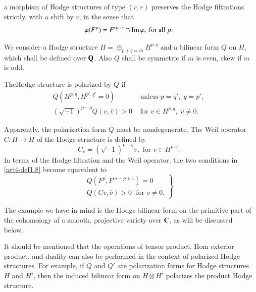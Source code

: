 a morphism of Hodge structures of type $(r,r)$ preserves the Hodge filtrations strictly, with a shift by $r$, in the sense that 
\begin{equation}
\varphi(F^p) = F'^{p+r} \cap \operatorname{Im} \varphi, \text{ for all } p. 
\label{art4-eq1.7}
\end{equation}

We consider a Hodge structure $H = \oplus_{p+q = m} H^{p,q}$ and a bilinear form $Q$ on $H$, which shall be defined over $\mathbf{Q}$. Also $Q$ shall be symmetric if $m$ is even, skew if $m$ is odd.

\begin{definition}\label{art4-def1.8}
The\pageoriginale Hodge structure is polarized by $Q$ if 
$$
\begin{matrix}
Q (H^{p,q} , H^{p', q'} =0) & \text{ unless } p = q', \; q = p',\\[2pt]
(\sqrt{-1})^{p-q} Q (v, \bar{v}) > 0 & \text{ for } v \in H^{p,q}, \; v \neq 0.
\end{matrix}
$$
\end{definition}

Apparently, the polarization form $Q$ must be nondegenerate. The Weil operator $C: H \to H$ of the Hodge structure is defined by 
\begin{equation}
C_v = (\sqrt{-1})^{p-q} v, \text{ for } v \in H^{p,q} . \label{art4-eq1.9}
\end{equation}
In terms of the Hodge filtration and the Weil operator, the two conditions in \ref{art4-def1.8} become equivalent to 
\begin{equation}
\left.
\begin{matrix}
Q (F^p, F^{m-p+1}) = 0\\
Q (C v, \bar{v}) >0 \;\text{  for } v \neq 0.
\end{matrix}\right\}
\label{art4-eq1.10}
\end{equation}

The example we have in mind is the Hodge bilinear form on the primitive part of the cohomology of a smooth, projective variety over $\mathbf{C}$, as will be discussed below.

It should be mentioned that the operations of tensor product, Hom exterior product, and duality can also be performed in the context of polarized Hodge structures. For example, if $Q$ and $Q'$ are polarization forms for Hodge structures $H$ and $H'$, then the induced bilinear form on $H \otimes H'$ polarizes the product Hodge structure.


